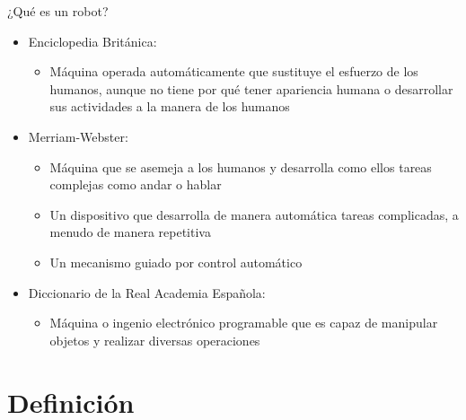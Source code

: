 \documentclass[aspectratio=169]{beamer}
\begin{document}
\begin{frame}{¿Qué es un robot?}
  \small
  \begin{itemize}
    \item Enciclopedia Británica:
    \begin{itemize}
      \item Máquina operada automáticamente que sustituye el esfuerzo de los humanos, aunque no tiene por qué tener apariencia humana o desarrollar sus actividades a la manera de los humanos
    \end{itemize}
    \item Merriam-Webster:
    \begin{itemize}
      \item Máquina que se asemeja a los humanos y desarrolla como ellos tareas complejas como andar o hablar
      \item Un dispositivo que desarrolla de manera automática tareas complicadas, a menudo de manera repetitiva
      \item Un mecanismo guiado por control automático
    \end{itemize}
    \item Diccionario de la Real Academia Española:
    \begin{itemize}
      \item Máquina o ingenio electrónico programable que es capaz de manipular objetos y realizar diversas operaciones
    \end{itemize}
  \end{itemize}
\end{frame}

\section{Definición}
\end{document}
